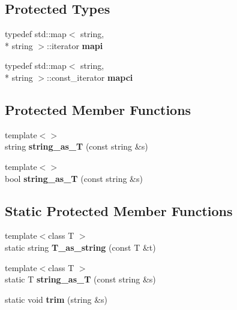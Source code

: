\subsection*{Protected Types}
\begin{DoxyCompactItemize}
\item 
\hypertarget{classConfigFile_acf14d63bff3a5a71772c8d339c0157bb}{typedef std\-::map$<$ string, \\*
string $>$\-::iterator {\bfseries mapi}}\label{classConfigFile_acf14d63bff3a5a71772c8d339c0157bb}

\item 
\hypertarget{classConfigFile_ad05f143a4103082130c32f84b2cb05fe}{typedef std\-::map$<$ string, \\*
string $>$\-::const\-\_\-iterator {\bfseries mapci}}\label{classConfigFile_ad05f143a4103082130c32f84b2cb05fe}

\end{DoxyCompactItemize}
\subsection*{Protected Member Functions}
\begin{DoxyCompactItemize}
\item 
\hypertarget{classConfigFile_a7d2b8acc0f7c2ea7892ef2e77d925ba9}{{\footnotesize template$<$$>$ }\\string {\bfseries string\-\_\-as\-\_\-\-T} (const string \&s)}\label{classConfigFile_a7d2b8acc0f7c2ea7892ef2e77d925ba9}

\item 
\hypertarget{classConfigFile_adda9a4a7de5eef0151e45b5874ddf50d}{{\footnotesize template$<$$>$ }\\bool {\bfseries string\-\_\-as\-\_\-\-T} (const string \&s)}\label{classConfigFile_adda9a4a7de5eef0151e45b5874ddf50d}

\end{DoxyCompactItemize}
\subsection*{Static Protected Member Functions}
\begin{DoxyCompactItemize}
\item 
\hypertarget{classConfigFile_a0146e58ab8e46279923c8d74a59503c6}{{\footnotesize template$<$class T $>$ }\\static string {\bfseries T\-\_\-as\-\_\-string} (const T \&t)}\label{classConfigFile_a0146e58ab8e46279923c8d74a59503c6}

\item 
\hypertarget{classConfigFile_ad4c671c2d019444e5304328f5099ea8c}{{\footnotesize template$<$class T $>$ }\\static T {\bfseries string\-\_\-as\-\_\-\-T} (const string \&s)}\label{classConfigFile_ad4c671c2d019444e5304328f5099ea8c}

\item 
\hypertarget{classConfigFile_a6b445b393fcf42386a804fc4077fac10}{static void {\bfseries trim} (string \&s)}\label{classConfigFile_a6b445b393fcf42386a804fc4077fac10}

\end{DoxyCompactItemize}
